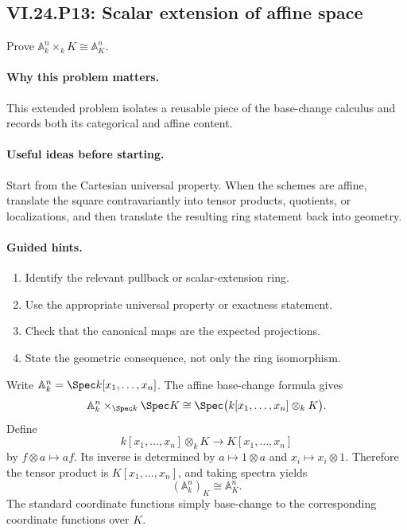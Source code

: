 \subsection*{VI.24.P13: Scalar extension of affine space}
\begin{problem}\label{prob:vi24-p13}
Prove $\mathbb A^n_k\times_kK\cong\mathbb A^n_K$.
\end{problem}

\ifdefined\FullProblemDossiers
\paragraph{Why this problem matters.}
This extended problem isolates a reusable piece of the base-change calculus and records both its categorical and affine content.

\paragraph{Useful ideas before starting.}
Start from the Cartesian universal property.  When the schemes are affine, translate the square contravariantly into tensor products, quotients, or localizations, and then translate the resulting ring statement back into geometry.

\paragraph{Guided hints.}
\begin{enumerate}
\item Identify the relevant pullback or scalar-extension ring.
\item Use the appropriate universal property or exactness statement.
\item Check that the canonical maps are the expected projections.
\item State the geometric consequence, not only the ring isomorphism.
\end{enumerate}

\begin{solution}
Write $\mathbb A^n_k=\Spec k[x_1,\ldots,x_n]$.  The affine base-change formula gives
\[
\mathbb A^n_k\times_{\Spec k}\Spec K
\cong\Spec\bigl(k[x_1,\ldots,x_n]\otimes_kK\bigr).
\]
Define
\[
k[x_1,\ldots,x_n]\otimes_kK\to K[x_1,\ldots,x_n]
\]
by $f\otimes a\mapsto af$.  Its inverse is determined by $a\mapsto1\otimes a$ and $x_i\mapsto x_i\otimes1$.  Therefore the tensor product is $K[x_1,\ldots,x_n]$, and taking spectra yields
\[
(\mathbb A^n_k)_K\cong\mathbb A^n_K.
\]
The standard coordinate functions simply base-change to the corresponding coordinate functions over $K$.
\end{solution}

